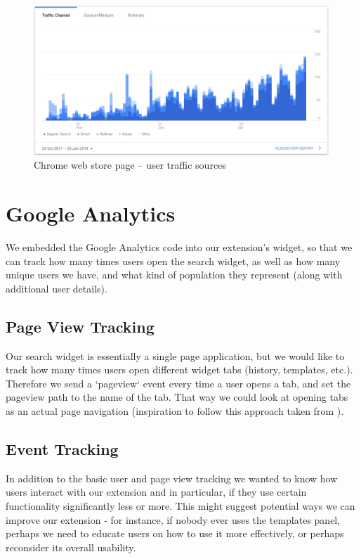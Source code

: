 \documentclass[bsc,frontabs,twoside,singlespacing,parskip,deptreport]{infthesis}
\begin{document}
\begin{figure}[h]
\centering
\includegraphics[width=0.99\textwidth]{../docs/user-acquisition.png}
\caption{Chrome web store page -- user traffic sources}
\end{figure}

\section{Google Analytics}
We embedded the Google Analytics code into our extension's widget, so that we can track how many times users open the search widget, as well as how many unique users we have, and what kind of population they represent (along with additional user details).

\subsection{Page View Tracking}
Our search widget is essentially a single page application, but we would like to track how many times users open different widget tabs (history, templates, etc.). Therefore we send a `pageview` event every time a user opens a tab, and set the pageview path to the name of the tab. That way we could look at opening tabs as an actual page navigation (inspiration to follow this approach taken from \cite{A22}).

\subsection{Event Tracking}
In addition to the basic user and page view tracking we wanted to know how users interact with our extension and in particular, if they use certain functionality significantly less or more. This might suggest potential ways we can improve our extension - for instance, if nobody ever uses the templates panel, perhaps we need to educate users on how to use it more effectively, or perhaps reconsider its overall usability.
\end{document}
